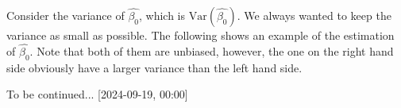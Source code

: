 \documentclass{article}
\theoremstyle{MyNonumberplain}
\theoremstyle{break}
\newcommand{\var}{\text{Var}}
\newcommand{\bt}[1]{\beta_{#1}}
\theoremstyle{break}
\theoremstyle{break}
\theoremstyle{break}
\begin{document}
Consider the variance of $\hat{\bt{0}}$, which is $\var(\hat{\bt{0}})$. We always wanted to keep the variance as small as possible. The following shows an example of the estimation of $\hat{\bt{0}}$. Note that both of them are unbiased, however, the one on the right hand side obviously have a larger variance than the left hand side. 

To be continued... [2024-09-19, 00:00]
\end{document}
